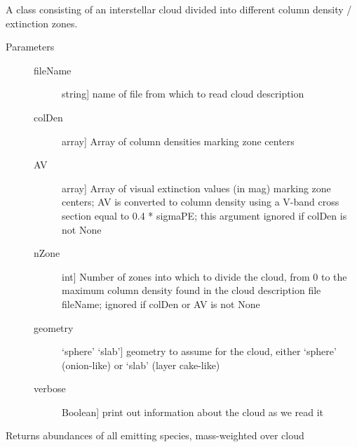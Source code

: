 \documentclass[letterpaper,10pt,english]{sphinxmanual}
\begin{document}
\begin{fulllineitems}
\label{fulldoc:despotic.zonedcloud}
A class consisting of an interstellar cloud divided into different
column density / extinction zones.
\begin{description}
\item[{Parameters}] \leavevmode\begin{description}
\item[{fileName}] \leavevmode{[}string{]}
name of file from which to read cloud description

\item[{colDen}] \leavevmode{[}array{]}
Array of column densities marking zone centers

\item[{AV}] \leavevmode{[}array{]}
Array of visual extinction values (in mag) marking zone
centers; AV is converted to column density using a V-band
cross section equal to 0.4 * sigmaPE; this argument
ignored if colDen is not None

\item[{nZone}] \leavevmode{[}int{]}
Number of zones into which to divide the cloud, from 0
to the maximum column density found in the cloud
description file fileName; ignored if colDen or AV is
not None

\item[{geometry}] \leavevmode{[}`sphere' \textbar{} `slab'{]}
geometry to assume for the cloud, either `sphere'
(onion-like) or `slab' (layer cake-like)

\item[{verbose}] \leavevmode{[}Boolean{]}
print out information about the cloud as we read it

\end{description}

\end{description}

\begin{fulllineitems}
\label{fulldoc:despotic.zonedcloud.abundances}
Returns abundances of all emitting species, mass-weighted over
cloud

\end{fulllineitems}



\end{fulllineitems}
\end{document}
